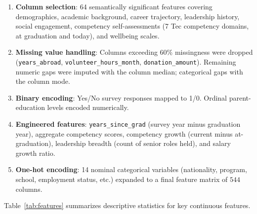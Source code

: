 \documentclass[10pt,twocolumn]{article}
\newenvironment{compactenum}{%
  \begin{enumerate}%
  \setlength{\itemsep}{1pt}\setlength{\parskip}{0pt}\setlength{\parsep}{0pt}%
}{\end{enumerate}}
\begin{document}
\begin{compactenum}
  \item \textbf{Column selection}: 64 semantically significant features covering demographics, academic background, career trajectory, leadership history, social engagement, competency self-assessments (7 Tec competency domains, at graduation and today), and wellbeing scales.
  \item \textbf{Missing value handling}: Columns exceeding 60\% missingness were dropped (\texttt{years\_abroad}, \texttt{volunteer\_hours\_month}, \texttt{donation\_amount}). Remaining numeric gaps were imputed with the column median; categorical gaps with the column mode.
  \item \textbf{Binary encoding}: Yes/No survey responses mapped to 1/0. Ordinal parent-education levels encoded numerically.
  \item \textbf{Engineered features}: \texttt{years\_since\_grad} (survey year minus graduation year), aggregate competency scores, competency growth (current minus at-graduation), leadership breadth (count of senior roles held), and salary growth ratio.
  \item \textbf{One-hot encoding}: 14 nominal categorical variables (nationality, program, school, employment status, etc.) expanded to a final feature matrix of $544$ columns.
\end{compactenum}

Table~\ref{tab:features} summarizes descriptive statistics for key continuous features.

\begin{table}[H]
\centering
\caption{Descriptive statistics for key continuous features (full sample).}
\label{tab:features}
\end{table}
\end{document}
